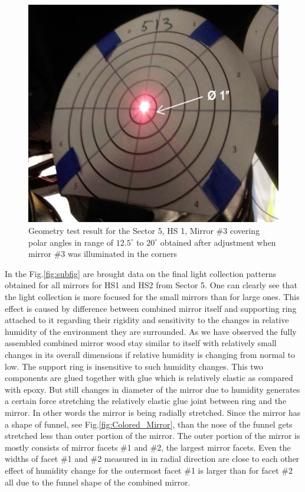 \begin{figure}[ht]
    \centering
    \includegraphics[width=1.0\linewidth,trim={0 0cm 0 0},clip]{images/GEO_TEST_5_1_3_Center.jpg}
    \caption{Geometry test result for the Sector 5, HS 1, Mirror \#3 covering polar angles in range of $12.5^\circ$ to $20^\circ$ obtained after adjustment when mirror \#3 was illuminated in the corners}
    \label{fig:GEO_TEST_5_1_3_Center}
\end{figure}

In the Fig.\ref{fig:subfig} are brought data on the final light collection patterns obtained for all mirrors for HS1 and HS2 from Sector 5. One can clearly see that the light collection is more focused for the small mirrors than for large ones. This effect is caused by difference between combined mirror itself and supporting ring attached to it regarding their rigidity and sensitivity to the changes in relative humidity of the environment they are surrounded. As we have observed the fully assembled combined mirror wood stay similar to itself with relatively small changes in its overall dimensions  if relative humidity is changing from normal to low. The support ring is insensitive to such humidity changes. This two components are glued together with glue which is relatively elastic as compared with epoxy. But still changes in diameter of the mirror due to humidity generates a certain force stretching the relatively elastic glue joint between ring and the mirror. In other words the mirror is being radially stretched. Since the mirror has a shape of funnel, see Fig.\ref{fig:Colored_Mirror}, than the nose of the funnel gets stretched less than outer portion of the mirror. The outer portion of the mirror is mostly consists of mirror facets \#1 and \#2, the largest mirror facets. Even the widths of facet \#1 and \#2 measured in in radial direction are close to each other effect of humidity change for the outermost facet \#1 is larger than for facet \#2 all due to the funnel shape of the combined mirror.

